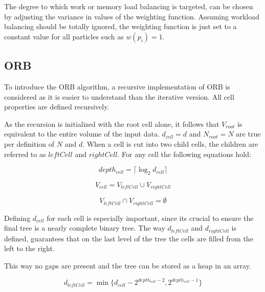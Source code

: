 \documentclass[]{article}
\begin{document}
The degree to which work or memory load balancing is targeted, can be chosen by adjusting the variance in values of the weighting function. Assuming workload balancing should be totally ignored, the weighting function is just set to a constant value for all particles such as $w(p_i) = 1$.

\subsection{ORB}


To introduce the ORB algorithm, a recursive implementation of ORB is considered as it is easier to understand than the iterative version. All cell properties are defined recursively.

As the recursion is initialized with the root cell alone, it follows that $V_{root}$ is equivalent to the entire volume of the input data. $d_{cell} = d$ and $N_{root} = N$ are true per definition of $N$ and $d$. 
When a cell is cut into two child cells, the children are referred to as $leftCell$ and $rightCell$. For any cell the following equations hold:

\begin{center}
	\begin{equation} \label{eq:l}
		depth_{cell} = \lceil \log_2{d_{cell}} \rceil 
	\end{equation}
\end{center}

\begin{center}
	\begin{equation}\label{eq:v}
		V_{cell} = V_{leftCell} \cup V_{rightCell}
	\end{equation}
\end{center}

\begin{center}
	\begin{equation}\label{eq:v2}
		V_{leftCell} \cap V_{rightCell} = \emptyset
	\end{equation}
\end{center}

Defining $d_{cell}$ for each cell is especially important, since its crucial to ensure the final tree is a nearly complete binary tree. The way $d_{leftCell}$ and $d_{rightCell}$ is defined, guarantees that on the last level of the tree the cells are filled from the left to the right. 

 This way no gaps are present and the tree can be stored as a heap in an array. 

\begin{center}
	\begin{equation} \label{eq:d1}
		d_{leftCell} = \min \{ d_{cell} - 2^{depth_{cell} -2}, 2^{depth_{cell} - 1}\}
	\end{equation}
\end{center}
\end{document}
